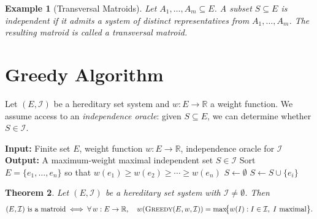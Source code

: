 \documentclass[11pt]{article}
\theoremstyle{plain}
\newtheorem{theorem}{Theorem}[section]
\newtheorem{example}[theorem]{Example}
\theoremstyle{definition}
\begin{document}
\begin{example}[Transversal Matroids]
Let $A_1, \dots, A_m \subseteq E$.
A subset $S \subseteq E$ is independent if it admits a system of distinct
representatives from $A_1, \dots, A_m$.
The resulting matroid is called a \emph{transversal matroid}.
\end{example}
 
\section{Greedy Algorithm}
 
Let $(E, \mathcal{I})$ be a hereditary set system and $w : E \to \mathbb{R}$
a weight function.
We assume access to an \emph{independence oracle}: given $S \subseteq E$,
we can determine whether $S \in \mathcal{I}$.
 
\begin{algorithm}[H]
\caption{\texttt{Greedy}$(E, w, \mathcal{I})$}
\begin{algorithmic}[1]
    \State \textbf{Input:} Finite set $E$, weight function $w : E \to \mathbb{R}$, independence oracle for $\mathcal{I}$
    \State \textbf{Output:} A maximum-weight maximal independent set $S \in \mathcal{I}$
    \State Sort $E = \{e_1, \dots, e_n\}$ so that $w(e_1) \geq w(e_2) \geq \cdots \geq w(e_n)$
    \State $S \gets \emptyset$
            \State $S \gets S \cup \{e_i\}$
        \EndIf
    \EndFor
    \State {}
\end{algorithmic}
\end{algorithm}
 
\begin{theorem}
Let $(E, \mathcal{I})$ be a hereditary set system with $\mathcal{I} \neq \emptyset$.
Then
\[
  (E, \mathcal{I}) \text{ is a matroid}
  \iff
  \forall\, w : E \to \mathbb{R},\quad
  w\!\left(\textsc{Greedy}(E,w,\mathcal{I})\right)
  = \max\!\bigl\{w(I) : I \in \mathcal{I},\; I \text{ maximal}\bigr\}.
\]
\end{theorem}
 
\end{document}
